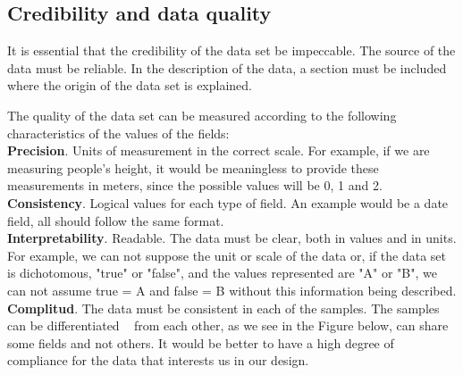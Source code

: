 \subsection{Credibility and data quality}
It is essential that the credibility of the data set be impeccable. The source of the data must be reliable. In the description of the data, a section must be included where the origin of the data set is explained.

The quality of the data set can be measured according to the following characteristics of the values of the fields: \\
 
\textbf{Precision}. Units of measurement in the correct scale. For example, if we are measuring people's height, it would be meaningless to provide these measurements in meters, since the possible values will be 0, 1 and 2. \\

\textbf{Consistency}. Logical values for each type of field. An example would be a date field, all should
follow the same format. \\

\textbf{Interpretability}. Readable. The data must be clear, both in values and in units. For example, we can not
suppose the unit or scale of the data or, if the data set is dichotomous, "true" or "false", and the values represented are
"A" or "B", we can not assume true = A and false = B without this information being described. \\

\textbf{Complitud}. The data must be consistent in each of the samples. The samples can be differentiated
  from each other, as we see in the Figure below, can share some fields and not others. It would be
better to have a high degree of compliance for the data that interests us in our design.


